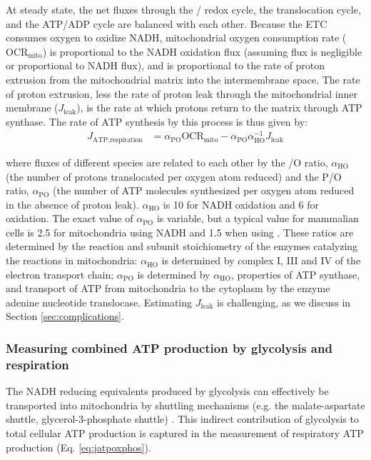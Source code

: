 \documentclass{compactarticle}
\begin{document}
At steady state, the net fluxes through the / redox cycle, the  translocation cycle, and the ATP/ADP cycle are balanced with each other. Because the ETC consumes oxygen to oxidize NADH, mitochondrial oxygen consumption rate ($\text{OCR}_\text{mito}$) is proportional to the NADH oxidation flux (assuming  flux is negligible or proportional to NADH flux), and is proportional to the rate of proton extrusion from the mitochondrial matrix into the intermembrane space. The rate of proton extrusion, less the rate of proton leak through the mitochondrial inner membrane ($J_\text{leak}$), is the rate at which protons return to the matrix through ATP synthase. The rate of ATP synthesis by this process is thus given by:
\begin{align}
    J_\text{ATP,respiration} &= \alpha_\text{PO} \text{OCR}_\text{mito} - \alpha_\text{PO} \alpha_\text{HO}^{-1} J_\text{leak}
    \label{eq:jatpoxphos}
\end{align}

\noindent where fluxes of different species are related to each other by the /O ratio, $\alpha_\text{HO}$ (the number of protons translocated per oxygen atom reduced) and the P/O ratio, $\alpha_\text{PO}$ (the number of ATP molecules synthesized per oxygen atom reduced in the absence of proton leak). $\alpha_\text{HO}$ is 10 for NADH oxidation and 6 for  oxidation. The exact value of $\alpha_\text{PO}$ is variable, but a typical value for mammalian cells is 2.5 for mitochondria using NADH and 1.5 when using  \cite{hinkle2005p,hinkle1991,brand1995}. These ratios are determined by the reaction and subunit stoichiometry of the enzymes catalyzing the reactions in mitochondria: $\alpha_\text{HO}$ is determined by complex I, III and IV of the electron transport chain; $\alpha_\text{PO}$ is determined by $\alpha_\text{HO}$, properties of ATP synthase, and transport of ATP from mitochondria to the cytoplasm by the enzyme adenine nucleotide translocase. Estimating $ J_\text{leak} $ is challenging, as we discuss in Section \ref{sec:complications}.

\subsubsection{Measuring combined ATP production by glycolysis and respiration}
\label{sec:integ_glyc_resp}

The NADH reducing equivalents produced by glycolysis can effectively be transported into mitochondria by shuttling mechanisms (e.g. the malate-aspartate shuttle, glycerol-3-phosphate shuttle) \cite{mookerjee2017quantifying}. This indirect contribution of glycolysis to total cellular ATP production is captured in the measurement of respiratory ATP production (Eq. \ref{eq:jatpoxphos}).
\end{document}
